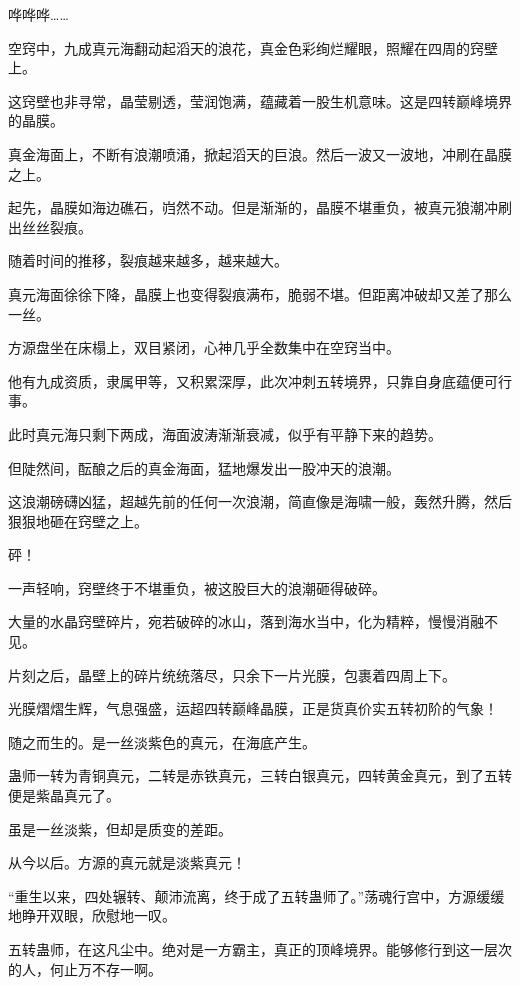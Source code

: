 
\begin{this_body}

哗哗哗……

空窍中，九成真元海翻动起滔天的浪花，真金色彩绚烂耀眼，照耀在四周的窍壁上。

这窍壁也非寻常，晶莹剔透，莹润饱满，蕴藏着一股生机意味。这是四转巅峰境界的晶膜。

真金海面上，不断有浪潮喷涌，掀起滔天的巨浪。然后一波又一波地，冲刷在晶膜之上。

起先，晶膜如海边礁石，岿然不动。但是渐渐的，晶膜不堪重负，被真元狼潮冲刷出丝丝裂痕。

随着时间的推移，裂痕越来越多，越来越大。

真元海面徐徐下降，晶膜上也变得裂痕满布，脆弱不堪。但距离冲破却又差了那么一丝。

方源盘坐在床榻上，双目紧闭，心神几乎全数集中在空窍当中。

他有九成资质，隶属甲等，又积累深厚，此次冲刺五转境界，只靠自身底蕴便可行事。

此时真元海只剩下两成，海面波涛渐渐衰减，似乎有平静下来的趋势。

但陡然间，酝酿之后的真金海面，猛地爆发出一股冲天的浪潮。

这浪潮磅礴凶猛，超越先前的任何一次浪潮，简直像是海啸一般，轰然升腾，然后狠狠地砸在窍壁之上。

砰！

一声轻响，窍壁终于不堪重负，被这股巨大的浪潮砸得破碎。

大量的水晶窍壁碎片，宛若破碎的冰山，落到海水当中，化为精粹，慢慢消融不见。

片刻之后，晶壁上的碎片统统落尽，只余下一片光膜，包裹着四周上下。

光膜熠熠生辉，气息强盛，运超四转巅峰晶膜，正是货真价实五转初阶的气象！

随之而生的。是一丝淡紫色的真元，在海底产生。

蛊师一转为青铜真元，二转是赤铁真元，三转白银真元，四转黄金真元，到了五转便是紫晶真元了。

虽是一丝淡紫，但却是质变的差距。

从今以后。方源的真元就是淡紫真元！

“重生以来，四处辗转、颠沛流离，终于成了五转蛊师了。”荡魂行宫中，方源缓缓地睁开双眼，欣慰地一叹。

五转蛊师，在这凡尘中。绝对是一方霸主，真正的顶峰境界。能够修行到这一层次的人，何止万不存一啊。


\end{this_body}
